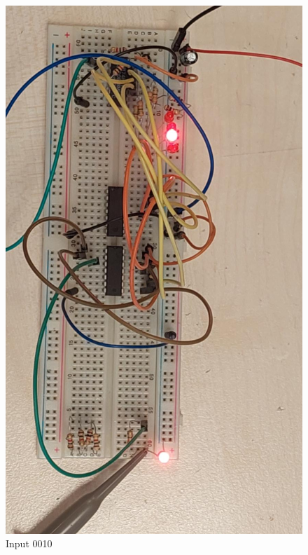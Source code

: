 \documentclass[a4paper, 12pt]{article}
\begin{document}
\begin{figure}
	\centering
	\includegraphics[width=\textwidth]{led-on.jpg}
	\caption{Input 0010}
\end{figure}
\end{document}

